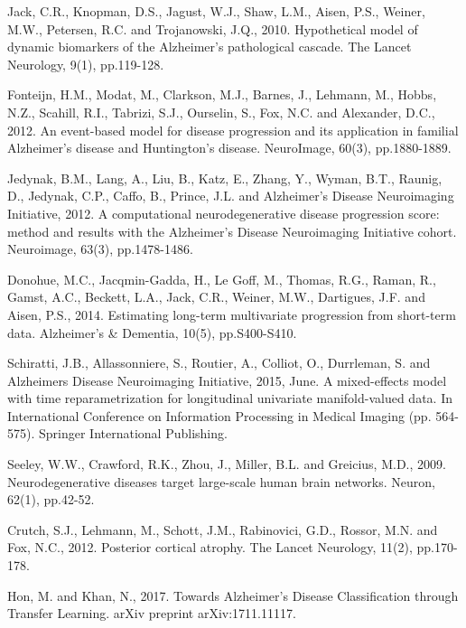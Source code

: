 \documentclass{llncs}
\begin{document}

\begin{thebibliography}{5}

Jack, C.R., Knopman, D.S., Jagust, W.J., Shaw, L.M., Aisen, P.S., Weiner, M.W., Petersen, R.C. and Trojanowski, J.Q., 2010. Hypothetical model of dynamic biomarkers of the Alzheimer's pathological cascade. The Lancet Neurology, 9(1), pp.119-128.

Fonteijn, H.M., Modat, M., Clarkson, M.J., Barnes, J., Lehmann, M., Hobbs, N.Z., Scahill, R.I., Tabrizi, S.J., Ourselin, S., Fox, N.C. and Alexander, D.C., 2012. An event-based model for disease progression and its application in familial Alzheimer's disease and Huntington's disease. NeuroImage, 60(3), pp.1880-1889.

Jedynak, B.M., Lang, A., Liu, B., Katz, E., Zhang, Y., Wyman, B.T., Raunig, D., Jedynak, C.P., Caffo, B., Prince, J.L. and Alzheimer's Disease Neuroimaging Initiative, 2012. A computational neurodegenerative disease progression score: method and results with the Alzheimer's Disease Neuroimaging Initiative cohort. Neuroimage, 63(3), pp.1478-1486.

Donohue, M.C., Jacqmin-Gadda, H., Le Goff, M., Thomas, R.G., Raman, R., Gamst, A.C., Beckett, L.A., Jack, C.R., Weiner, M.W., Dartigues, J.F. and Aisen, P.S., 2014. Estimating long-term multivariate progression from short-term data. Alzheimer's \& Dementia, 10(5), pp.S400-S410.

Schiratti, J.B., Allassonniere, S., Routier, A., Colliot, O., Durrleman, S. and Alzheimers Disease Neuroimaging Initiative, 2015, June. A mixed-effects model with time reparametrization for longitudinal univariate manifold-valued data. In International Conference on Information Processing in Medical Imaging (pp. 564-575). Springer International Publishing.


Seeley, W.W., Crawford, R.K., Zhou, J., Miller, B.L. and Greicius, M.D., 2009. Neurodegenerative diseases target large-scale human brain networks. Neuron, 62(1), pp.42-52.

Crutch, S.J., Lehmann, M., Schott, J.M., Rabinovici, G.D., Rossor, M.N. and Fox, N.C., 2012. Posterior cortical atrophy. The Lancet Neurology, 11(2), pp.170-178.

Hon, M. and Khan, N., 2017. Towards Alzheimer's Disease Classification through Transfer Learning. arXiv preprint arXiv:1711.11117.

\end{thebibliography}

\clearpage
\end{document}
